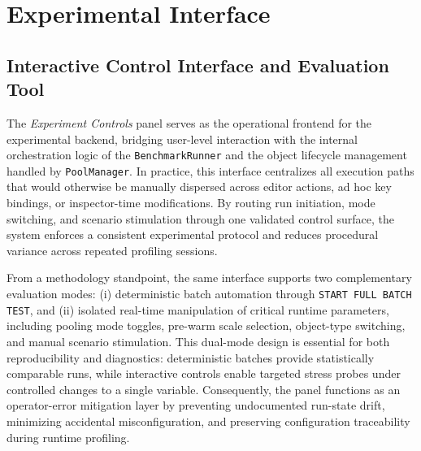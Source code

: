 \documentclass[11pt]{article}
\begin{document}
\section{Experimental Interface}

\subsection{Interactive Control Interface and Evaluation Tool}

The \emph{Experiment Controls} panel serves as the operational frontend for the experimental backend, bridging user-level interaction with the internal orchestration logic of the \texttt{BenchmarkRunner} and the object lifecycle management handled by \texttt{PoolManager}. In practice, this interface centralizes all execution paths that would otherwise be manually dispersed across editor actions, ad hoc key bindings, or inspector-time modifications. By routing run initiation, mode switching, and scenario stimulation through one validated control surface, the system enforces a consistent experimental protocol and reduces procedural variance across repeated profiling sessions.

From a methodology standpoint, the same interface supports two complementary evaluation modes: (i) deterministic batch automation through \texttt{START FULL BATCH TEST}, and (ii) isolated real-time manipulation of critical runtime parameters, including pooling mode toggles, pre-warm scale selection, object-type switching, and manual scenario stimulation. This dual-mode design is essential for both reproducibility and diagnostics: deterministic batches provide statistically comparable runs, while interactive controls enable targeted stress probes under controlled changes to a single variable. Consequently, the panel functions as an operator-error mitigation layer by preventing undocumented run-state drift, minimizing accidental misconfiguration, and preserving configuration traceability during runtime profiling.
\end{document}
